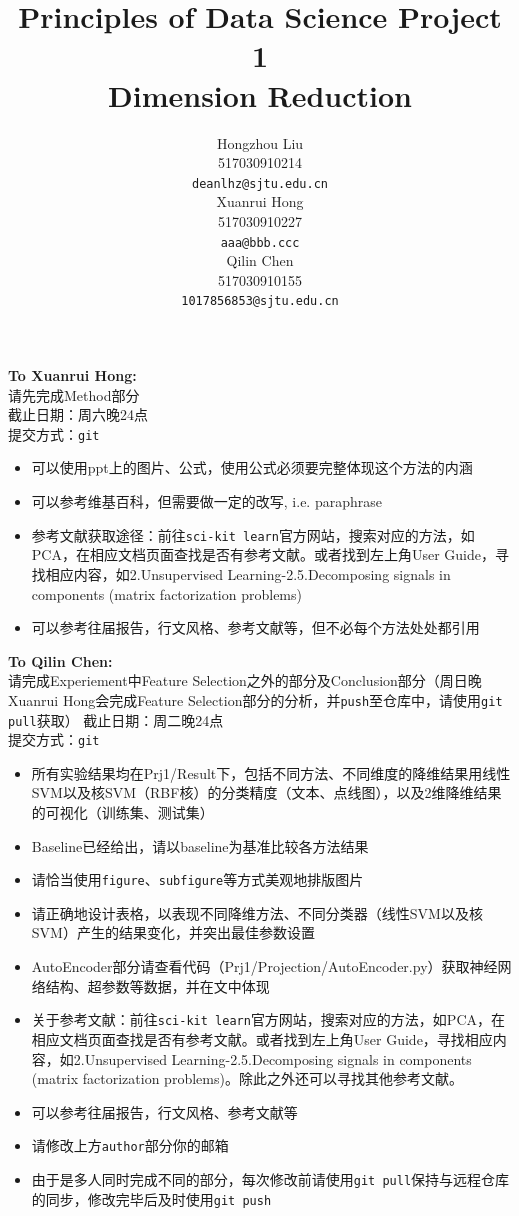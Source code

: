 \documentclass{article}
\title{Principles of Data Science Project 1\\
        Dimension Reduction}
\author{
  Hongzhou Liu \\
  517030910214 \\
  \texttt{deanlhz@sjtu.edu.cn} \\
  \And
  Xuanrui Hong \\
  517030910227 \\
  \texttt{aaa@bbb.ccc} \\
  \And
  Qilin Chen \\
  517030910155 \\
  \texttt{1017856853@sjtu.edu.cn} \\
}
\begin{document}


\maketitle

\textbf{To Xuanrui Hong:}\\
请先完成Method部分\\
截止日期：周六晚24点\\
提交方式：\texttt{git}\\
\begin{itemize}
  \item 可以使用ppt上的图片、公式，使用公式必须要完整体现这个方法的内涵
  \item 可以参考维基百科，但需要做一定的改写, i.e. paraphrase
  \item 参考文献获取途径：前往\texttt{sci-kit learn}官方网站，搜索对应的方法，如PCA，在相应文档页面查找是否有参考文献。或者找到左上角User Guide，寻找相应内容，如2.Unsupervised Learning-2.5.Decomposing signals in components (matrix factorization problems)
  \item 可以参考往届报告，行文风格、参考文献等，但不必每个方法处处都引用
\end{itemize}

\textbf{To Qilin Chen:}\\
请完成Experiement中Feature Selection之外的部分及Conclusion部分（周日晚Xuanrui Hong会完成Feature Selection部分的分析，并\texttt{push}至仓库中，请使用\texttt{git pull}获取）
截止日期：周二晚24点 \\
提交方式：\texttt{git} \\
\begin{itemize}
  \item 所有实验结果均在Prj1/Result下，包括不同方法、不同维度的降维结果用线性SVM以及核SVM（RBF核）的分类精度（文本、点线图），以及2维降维结果的可视化（训练集、测试集）
  \item Baseline已经给出，请以baseline为基准比较各方法结果
  \item 请恰当使用\texttt{figure}、\texttt{subfigure}等方式美观地排版图片
  \item 请正确地设计表格，以表现不同降维方法、不同分类器（线性SVM以及核SVM）产生的结果变化，并突出最佳参数设置
  \item AutoEncoder部分请查看代码（Prj1/Projection/AutoEncoder.py）获取神经网络结构、超参数等数据，并在文中体现
  \item 关于参考文献：前往\texttt{sci-kit learn}官方网站，搜索对应的方法，如PCA，在相应文档页面查找是否有参考文献。或者找到左上角User Guide，寻找相应内容，如2.Unsupervised Learning-2.5.Decomposing signals in components (matrix factorization problems)。除此之外还可以寻找其他参考文献。
  \item 可以参考往届报告，行文风格、参考文献等
  \item 请修改上方\texttt{author}部分你的邮箱
  \item 由于是多人同时完成不同的部分，每次修改前请使用\texttt{git pull}保持与远程仓库的同步，修改完毕后及时使用\texttt{git push}
\end{itemize}
\end{document}
